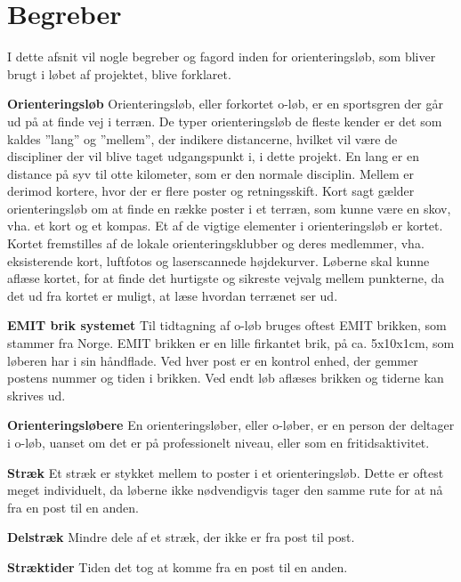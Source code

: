 \newpage
\section{Begreber}
I dette afsnit vil nogle begreber og fagord inden for orienteringsløb, som bliver brugt i løbet af projektet, blive forklaret.

\textbf{Orienteringsløb}\newline
Orienteringsløb, eller forkortet o-løb, er en sportsgren der går ud på at finde vej i terræn. \newline
De typer orienteringsløb de fleste kender er det som kaldes ”lang” og ”mellem”, der indikere distancerne, hvilket vil være de discipliner der vil blive taget udgangspunkt i, i dette projekt.\newline
En lang er en distance på syv til otte kilometer, som er den normale disciplin. Mellem er derimod kortere, hvor der er flere poster og retningsskift.\newline
Kort sagt gælder orienteringsløb om at finde en række poster i et terræn, som kunne være en skov, vha. et kort og et kompas. Et af de vigtige elementer i orienteringsløb er kortet. Kortet fremstilles af de lokale orienteringsklubber og deres medlemmer, vha. eksisterende kort, luftfotos og laserscannede højdekurver. Løberne skal kunne aflæse kortet, for at finde det hurtigste og sikreste vejvalg mellem punkterne, da det ud fra kortet er muligt, at læse hvordan terrænet ser ud. \citep{DOF}   

\textbf{EMIT brik systemet}\newline
Til tidtagning af o-løb bruges oftest EMIT brikken, som stammer fra Norge. EMIT brikken er en lille firkantet brik, på ca. 5x10x1cm, som løberen har i sin håndflade. Ved hver post er en kontrol enhed, der gemmer postens nummer og tiden i brikken. Ved endt løb aflæses brikken og tiderne kan skrives ud. 

\textbf{Orienteringsløbere}\newline
En orienteringsløber, eller o-løber, er en person der deltager i o-løb, uanset om det er på professionelt niveau, eller som en fritidsaktivitet.

\textbf{Stræk}\newline
Et stræk er stykket mellem to poster i et orienteringsløb. Dette er oftest meget individuelt, da løberne ikke nødvendigvis tager den samme rute for at nå fra en post til en anden.

\textbf{Delstræk}\newline
Mindre dele af et stræk, der ikke er fra post til post. 

\textbf{Stræktider}\newline
Tiden det tog at komme fra en post til en anden.\newline

